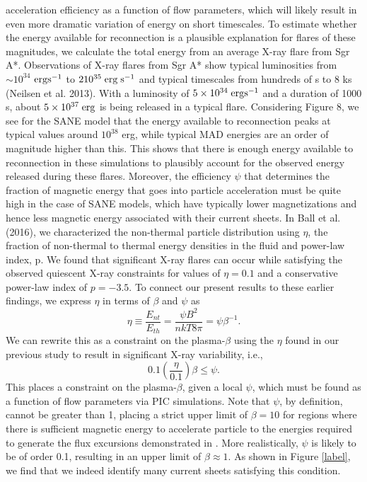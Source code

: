 acceleration efficiency as a function of flow parameters,
which will likely result in even more dramatic variation
of energy on short timescales.
To estimate whether the energy available for reconnection is a plausible explanation for flares of these magnitudes, we calculate the total energy from an average X-ray flare from Sgr A*. Observations of X-ray flares from
Sgr A* show typical luminosities from  $\sim 10^{34}$ $\rm{erg} \rm{s}^{-1}$ to $2  10^{35} \; \rm{erg} \;  s^{-1}$ and typical timescales from hundreds of s to 8 ks (Neilsen et al. 2013). With a luminosity of $5 \times 10^{34} \; \rm{erg} \rm{s}^{-1}$ and a duration of 1000 s, about $5 \times 10^{37} \; \rm{erg}$ is being released in a typical flare.
Considering Figure 8, we see for the SANE model that
the energy available to reconnection peaks at typical values around $10^{38}$ erg, while typical MAD energies are an
order of magnitude higher than this. This shows that
there is enough energy available to reconnection in these
simulations to plausibly account for the observed energy
released during these flares. Moreover, the efficiency $\psi$
that determines the fraction of magnetic energy that goes
into particle acceleration must be quite high in the case
of SANE models, which have typically lower magnetizations and hence less magnetic energy associated with
their current sheets.
In Ball et al. (2016), we characterized the non-thermal
particle distribution using $\eta$, the fraction of non-thermal
to thermal energy densities in the fluid and power-law
index, p. We found that significant X-ray flares can occur
while satisfying the observed quiescent X-ray constraints
for values of $\eta = 0.1$ and a conservative power-law index
of $p = -3.5$. To connect our present results to these
earlier findings, we express $\eta$ in terms of $\beta$ and $\psi$ as
\begin{equation}
	\eta \equiv \frac{E_{nt}}{E_{th}}=\frac{\psi B^2}{nkT8\pi}=\psi \beta^{-1}.
\end{equation}
We can rewrite this as a constraint on the plasma-$\beta$ using the $\eta$ found in our previous study to result in significant X-ray variability, i.e., 
\begin{equation}
	0.1 (\frac{\eta}{0.1}) \beta \leq \psi.
\end{equation}
This places a constraint on the plasma-$\beta$, given a local
$\psi$, which must be found as a function of flow parameters
via PIC simulations. Note that $\psi$, by definition, cannot
be greater than 1, placing a strict upper limit of $\beta = 10$
for regions where there is sufficient magnetic energy to
accelerate particle to the energies required to generate
the flux excursions demonstrated in \citet{ball2016}.
More realistically, $\psi$ is likely to be of order 0.1, resulting
in an upper limit of $\beta \approx 1$. As shown in Figure \ref{label}, we find
that we indeed identify many current sheets satisfying
this condition.

